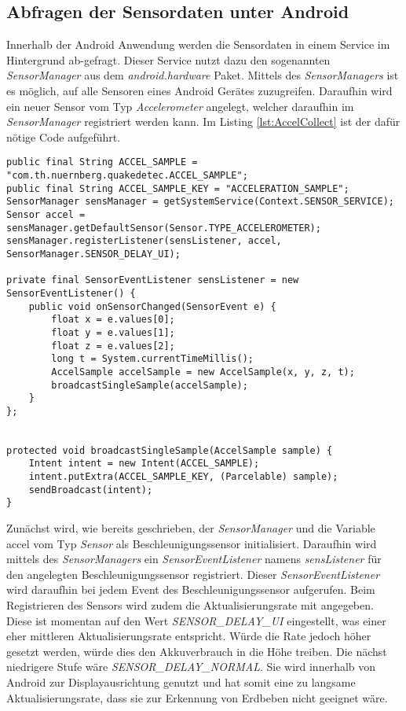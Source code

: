 \subsection{Abfragen der Sensordaten unter Android}
Innerhalb der Android Anwendung werden die Sensordaten in einem Service im Hintergrund ab-gefragt. Dieser Service nutzt dazu den sogenannten \textit{SensorManager} aus dem \textit{android.hardware} Paket. Mittels des \textit{SensorManagers} ist es möglich, auf alle Sensoren eines Android Gerätes zuzugreifen. Daraufhin wird ein neuer Sensor vom Typ \textit{Accelerometer} angelegt, welcher daraufhin im \textit{SensorManager} registriert werden kann. Im Listing \ref{lst:AccelCollect} ist der dafür nötige Code aufgeführt.
\begin{lstlisting}[caption={Abfragen der Sensordaten unter Android},label=lst:AccelCollect]
public final String ACCEL_SAMPLE = "com.th.nuernberg.quakedetec.ACCEL_SAMPLE";
public final String ACCEL_SAMPLE_KEY = "ACCELERATION_SAMPLE";
SensorManager sensManager = getSystemService(Context.SENSOR_SERVICE);
Sensor accel = sensManager.getDefaultSensor(Sensor.TYPE_ACCELEROMETER);
sensManager.registerListener(sensListener, accel, SensorManager.SENSOR_DELAY_UI);

private final SensorEventListener sensListener = new SensorEventListener() {
	public void onSensorChanged(SensorEvent e) {
		float x = e.values[0]; 
		float y = e.values[1]; 
		float z = e.values[2]; 
		long t = System.currentTimeMillis();
		AccelSample accelSample = new AccelSample(x, y, z, t);
		broadcastSingleSample(accelSample);
	}
};


protected void broadcastSingleSample(AccelSample sample) {
	Intent intent = new Intent(ACCEL_SAMPLE);
	intent.putExtra(ACCEL_SAMPLE_KEY, (Parcelable) sample);
	sendBroadcast(intent);
}
\end{lstlisting}
Zunächst wird, wie bereits geschrieben, der \textit{SensorManager} und die Variable accel vom Typ \textit{Sensor} als Beschleunigungssensor initialisiert. Daraufhin wird mittels des \textit{SensorManagers} ein \textit{SensorEventListener} namens \textit{sensListener} für den angelegten Beschleunigungssensor registriert. Dieser \textit{SensorEventListener} wird daraufhin bei jedem Event des Beschleunigungssensor aufgerufen. Beim Registrieren des Sensors wird zudem die Aktualisierungsrate mit angegeben. Diese ist momentan auf den Wert \textit{SENSOR\_DELAY\_UI} eingestellt, was einer eher mittleren Aktualisierungsrate entspricht. Würde die Rate jedoch höher gesetzt werden, würde dies den Akkuverbrauch in die Höhe treiben. Die nächst niedrigere Stufe wäre \textit{SENSOR\_DELAY\_NORMAL}. Sie wird innerhalb von Android zur Displayausrichtung genutzt und hat somit eine zu langsame Aktualisierungsrate, dass sie zur Erkennung von Erdbeben nicht geeignet wäre.\\
